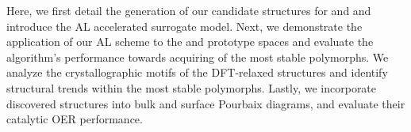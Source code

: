 %
%
Here, we first detail the generation of our candidate structures for \IrOtwo and \IrOthree and introduce the AL accelerated surrogate model.
%
Next, we demonstrate the application of our AL scheme to the \IrOtwo and \IrOthree prototype spaces and evaluate
the algorithm's performance towards acquiring of the most stable polymorphs.
%
We analyze the crystallographic motifs of the DFT-relaxed structures and identify structural trends within the most stable polymorphs.
%
Lastly, we incorporate discovered structures into bulk and surface Pourbaix diagrams, and evaluate their catalytic OER performance.




%
%
%
%
%
%

